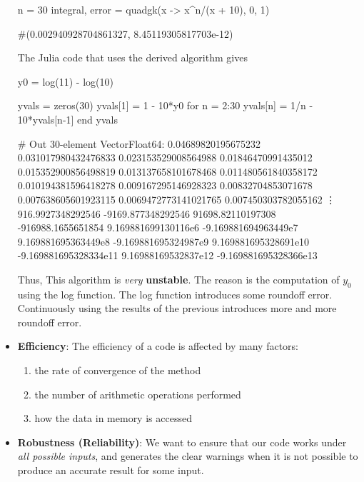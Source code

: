 \documentclass{report}
\begin{document}
\begin{itemize}
\begin{jlcode}
        n = 30
        integral, error = quadgk(x -> x^n/(x + 10), 0, 1)

        #(0.002940928704861327, 8.45119305817703e-12)
    \end{jlcode}
    \bigbreak \noindent 
    The Julia code that uses the derived algorithm gives
    \bigbreak \noindent 
    \begin{jlcode}
        y0 = log(11) - log(10)

        yvals = zeros(30)
        yvals[1] = 1 - 10*y0
        for n = 2:30
            yvals[n] = 1/n - 10*yvals[n-1]
        end
        yvals

        # Out
        30-element Vector{Float64}:
       0.04689820195675232
       0.031017980432476833
       0.023153529008564988
       0.01846470991435012
       0.015352900856498819
       0.013137658101678468
       0.011480561840358172
       0.010194381596418278
       0.009167295146928323
       0.00832704853071678
       0.007638605601923115
       0.0069472773141021765
       0.007450303782055162
       ⋮
     916.9927348292546
   -9169.877348292546
   91698.82110197308
 -916988.1655651854
       9.169881699130116e6
      -9.169881694963449e7
       9.169881695363449e8
      -9.169881695324987e9
       9.169881695328691e10
      -9.169881695328334e11
       9.16988169532837e12
      -9.169881695328366e13
    \end{jlcode}
    \bigbreak \noindent 
    Thus, This algorithm is \textit{very} \textbf{unstable}. The reason is the computation of $y_{0}$ using the log function. The log function introduces some roundoff error. Continuously using the results of the previous introduces more and more roundoff error.
\item \textbf{Efficiency}:
    The efficiency of a code is affected by many factors:
    \begin{enumerate}
        \item the rate of convergence of the method
        \item the number of arithmetic operations performed
        \item how the data in memory is accessed
    \end{enumerate}
\item \textbf{Robustness (Reliability)}: We want to ensure that our code works under \textit{all possible inputs}, and generates the clear warnings when it is not possible to produce an accurate result for some input.
    \end{itemize}
\end{document}
